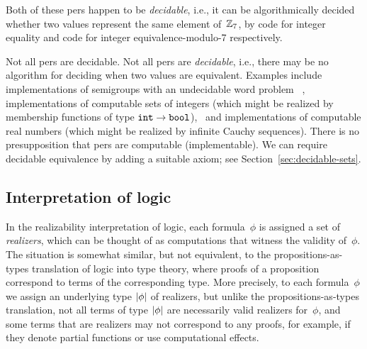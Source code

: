 Both of these pers happen to be \emph{decidable}, i.e., it can be
algorithmically decided whether two values represent the same element
of~$\mathbb{Z}_7$, by code for integer equality and code for integer
equivalence-modulo-7 respectively. \fi %

\iflong
%
Not all pers are decidable.
%
\else
%
Not all pers are \emph{decidable}, i.e., there may be no algorithm for deciding
when two values are equivalent.
%
\fi
%
Examples include implementations of semigroups with an undecidable
word problem~\cite{post47:_recur_unsol_probl_thue}%
\iflong, implementations of computable sets of integers (which might
be realized by membership functions of type $\mathtt{int}\to\mathtt{bool}$),\fi
\ and implementations of computable real numbers (which might be
realized by infinite Cauchy sequences).
%
\iflong
%
There is no presupposition that pers are computable
(implementable). We can require decidable equivalence by adding a
suitable axiom; see Section~\ref{sec:decidable-sets}. \fi

\subsection{Interpretation of logic}
\label{sec:interpretation-logic}

In the realizability interpretation of logic, each formula~$\phi$ is
assigned a set of \emph{realizers}, which can be thought of as
computations that witness the validity of~$\phi$. The situation is
somewhat similar, but not equivalent, to the propositions-as-types
translation of logic into type theory, where proofs of a
proposition correspond to terms of the corresponding type. More
precisely, to each formula~$\phi$ we assign an underlying type
$|\phi|$ of realizers, but unlike the propositions-as-types
translation, not all terms of type $|\phi|$ are necessarily
valid realizers for~$\phi$, and some terms that are realizers may not
correspond to any proofs, for example, if they denote partial
functions or use computational effects.

